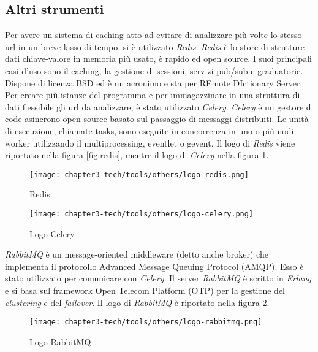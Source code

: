 \subsection{Altri strumenti} \label{subsec: altri strumenti}

Per avere un sistema di caching atto ad evitare di analizzare più volte lo stesso url in un breve lasso di tempo, si è utilizzato \emph{Redis}. \emph{Redis} è lo store di strutture dati chiave-valore in memoria più usato, è rapido ed open source. I suoi principali casi d’uso sono il caching, la gestione di sessioni, servizi pub/sub e graduatorie. Dispone di licenza BSD ed è un acronimo e sta per REmote DIctionary Server.
Per creare più istanze del programma e per immagazzinare in una struttura di dati flessibile gli url da analizzare, è stato utilizzato \emph{Celery}. \emph{Celery} è un gestore di code asincrono open source basato sul passaggio di messaggi distribuiti. Le unità di esecuzione, chiamate tasks, sono eseguite in concorrenza in uno o più nodi worker utilizzando il multiprocessing, eventlet o gevent. Il logo di \emph{Redis} viene riportato nella figura \ref{fig:redis}, mentre il logo di \emph{Celery} nella figura \ref{fig:celery}.
\begin{figure}[!h]
    \begin{minipage}{.5\textwidth} 
        \centering 
        \texttt{[image: chapter3-tech/tools/others/logo-redis.png]} 
        \caption{Redis} 
        \label{fig:redis} 
    \end{minipage}%
    \begin{minipage}{.5\textwidth} 
        \centering 
        \texttt{[image: chapter3-tech/tools/others/logo-celery.png]} 
        \caption{Logo Celery} 
        \label{fig:celery} 
    \end{minipage}%
\end{figure}

\noindent
\emph{RabbitMQ} è un message-oriented middleware (detto anche \gls{broker}) che implementa il protocollo Advanced Message Queuing Protocol (AMQP). Esso è stato utilizzato per comunicare con \emph{Celery}. Il server \emph{RabbitMQ} è scritto in \emph{Erlang} e si basa sul framework Open Telecom Platform (OTP) per la gestione del \emph{clustering} e del \emph{failover}. Il logo di \emph{RabbitMQ} è riportato nella figura \ref{fig:rabbitmq}.
\begin{figure}[!h] 
    \centering 
    \texttt{[image: chapter3-tech/tools/others/logo-rabbitmq.png]} 
    \caption{Logo RabbitMQ}
    \label{fig:rabbitmq} 
\end{figure}

